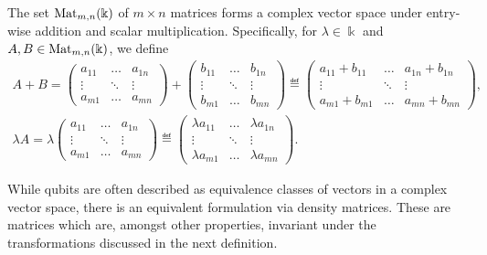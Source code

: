 \documentclass[a4paper, oneside, 12pt]{amsart}
\begin{document}
\begin{remark}\label{rmk:matrices-are-a-vector-space}
  The set \( \operatorname{Mat}_{m,n}(\Bbbk) \) of \( m \times n \) matrices forms a complex vector space under entry-wise addition and scalar multiplication.
  Specifically, for \( \lambda \in \Bbbk \) and \( A, B \in \operatorname{Mat}_{m,n}(\Bbbk) \), we define
  \begin{subequations}
    \begin{gather}
      A + B =
      \begin{pmatrix}
        a_{11} & \dots &  a_{1n} \\
        \vdots & \ddots & \vdots \\
        a_{m1} & \dots &  a_{mn}
      \end{pmatrix}
      +
      \begin{pmatrix}
        b_{11} & \dots &  b_{1n} \\
        \vdots & \ddots & \vdots \\
        b_{m1} & \dots &  b_{mn}
      \end{pmatrix}
      \eqdef \begin{pmatrix}
        a_{11} + b_{11} & \dots & a_{1n} + b_{1n} \\
        \vdots & \ddots & \vdots \\
        a_{m1} + b_{m1} & \dots & a_{mn} + b_{mn}
      \end{pmatrix}, \\
      \lambda A =
      \lambda
      \begin{pmatrix}
        a_{11} & \dots &  a_{1n} \\
        \vdots & \ddots & \vdots \\
        a_{m1} & \dots &  a_{mn}
      \end{pmatrix}
      \eqdef \begin{pmatrix}
        \lambda a_{11} & \dots & \lambda a_{1n} \\
        \vdots & \ddots & \vdots \\
        \lambda a_{m1} & \dots & \lambda a_{mn}
      \end{pmatrix}.
    \end{gather}
  \end{subequations}
\end{remark}

While qubits are often described as equivalence classes of vectors in a complex vector space, there is an equivalent formulation via density matrices.
These are matrices which are, amongst other properties, invariant under the transformations discussed in the next definition.
\end{document}
